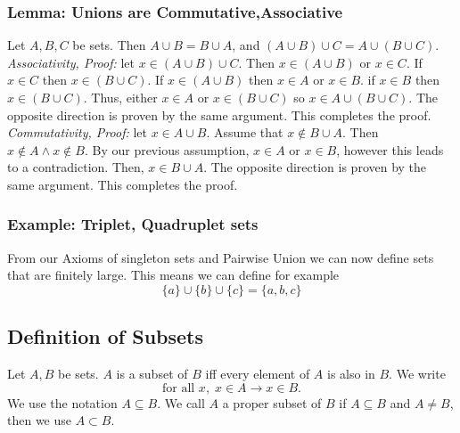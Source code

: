 \subsubsection{Lemma: Unions are Commutative,Associative}
Let $A, B, C$ be sets. Then $A \cup B = B \cup A$, and $(A\cup B)\cup C = A\cup(B\cup C)$.\\
\textit{Associativity, Proof:} let $x\in (A\cup B)\cup C$. Then $x\in (A\cup B)$ or $x\in C$. If $x\in C$ then $x\in(B\cup C)$. If $x\in(A\cup B)$ then $x\in A$ or $x\in B$. if $x\in B$ then $x\in (B\cup C)$. Thus, either $x\in A$ or $x\in(B\cup C)$ so $x\in A\cup(B\cup C)$. The opposite direction is proven by the same argument. This completes the proof.\\
\textit{Commutativity, Proof:} let $x\in A\cup B$. Assume that $x\notin B\cup A$. Then $x\notin A \wedge x\notin B$. By our previous assumption, $x\in A$ or $x\in B$, however this leads to a contradiction. Then, $x\in B\cup A$. The opposite direction is proven by the same argument. This completes the proof.

\subsubsection{Example: Triplet, Quadruplet sets}

From our Axioms of singleton sets and Pairwise Union we can now define sets that are finitely large. This means we can define for example
\begin{equation}
	\{a\} \cup \{b\} \cup \{c\} = \{a,b,c\}
\end{equation}

\subsection{Definition of Subsets}
Let $A,B$ be sets. $A$ is a subset of $B$ iff every element of $A$ is also in $B$. We write
\begin{equation}
	\text{for all }x,\; x\in A \rightarrow x\in B.
\end{equation}
We use the notation $A\subseteq B$. We call $A$ a proper subset of $B$ if $A\subseteq B$ and $A\neq B$, then we use $A \subset B$.

